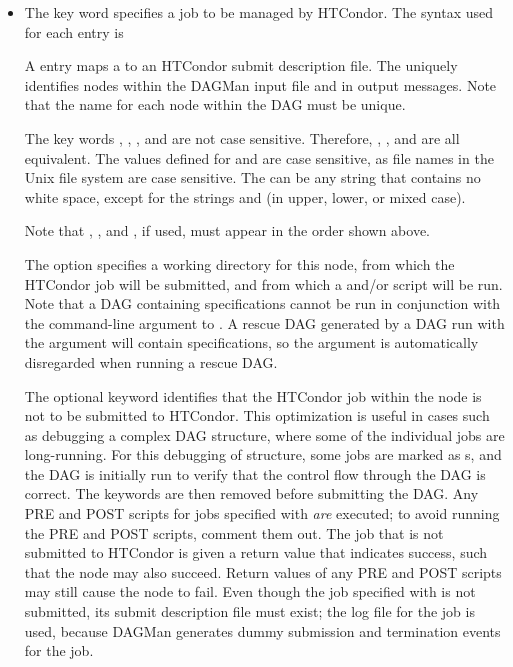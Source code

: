\begin{itemize}

\label{dagman:JOB}
\item {}

The  key word specifies a job to be managed by HTCondor.
The syntax used for each  entry is

  
  

A  entry maps a  to an HTCondor submit description file.
The  uniquely identifies nodes within the
DAGMan input file and in output messages.
Note that the name for each node within the DAG
must be unique.

The key words , , , and 
are not case sensitive.
Therefore, , , and  are all equivalent.
The values defined for  and 
are case sensitive, as file names in
the Unix file system are case sensitive.
The  can be any string that contains no white space, except
for the strings  and  (in upper, lower, or mixed
case).

Note that , , and , if used, must appear
in the order shown above.

The  option specifies a working directory
for this node,
from which the HTCondor job will be submitted,
and from which a  and/or
 script will be run.
Note that a DAG containing  specifications cannot
be run in conjunction with the  command-line
argument to .  A rescue DAG generated by
a DAG run with the  argument will contain
 specifications, so the  argument is
automatically disregarded when running a rescue DAG.

\label{dagman:NOOP}
The optional  keyword identifies that the HTCondor job within
the node is not to be submitted to HTCondor.
This optimization is useful in cases such as debugging a complex DAG structure,
where some of the individual jobs are long-running.
For this debugging of structure,
some jobs are marked as s, and
the DAG is initially run to verify that the control flow through
the DAG is correct.
The  keywords are then removed before submitting the DAG.
Any PRE and POST scripts
for jobs specified with  \emph{are} executed;
to avoid running the PRE and POST scripts, comment them out.
The job that is not submitted to HTCondor is given a return value that indicates
success, such that the node may also succeed.
Return values of any 
PRE and POST scripts may still cause the node to fail.
Even though the job specified with  is not submitted,
its submit description file must exist;
the log file for the job is used, 
because DAGMan generates dummy submission and termination events for the job.


\end{itemize}
